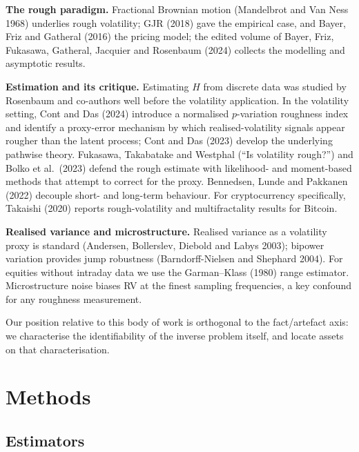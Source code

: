 \documentclass[11pt]{article}
\begin{document}
\noindent\textbf{The rough paradigm.} Fractional Brownian motion (Mandelbrot and
Van Ness 1968) underlies rough volatility; GJR (2018) gave the empirical case, and
Bayer, Friz and Gatheral (2016) the pricing model; the edited volume of Bayer,
Friz, Fukasawa, Gatheral, Jacquier and Rosenbaum (2024) collects the modelling and
asymptotic results.

\medskip
\noindent\textbf{Estimation and its critique.} Estimating $H$ from discrete data
was studied by Rosenbaum and co-authors well before the volatility application. In
the volatility setting, Cont and Das (2024) introduce a normalised $p$-variation
roughness index and identify a proxy-error mechanism by which realised-volatility
signals appear rougher than the latent process; Cont and Das (2023) develop the
underlying pathwise theory. Fukasawa, Takabatake and Westphal (``Is volatility
rough?'') and Bolko et al.\ (2023) defend the rough estimate with likelihood- and
moment-based methods that attempt to correct for the proxy. Bennedsen, Lunde and
Pakkanen (2022) decouple short- and long-term behaviour. For cryptocurrency
specifically, Takaishi (2020) reports rough-volatility and multifractality results
for Bitcoin.

\medskip
\noindent\textbf{Realised variance and microstructure.} Realised variance as a
volatility proxy is standard (Andersen, Bollerslev, Diebold and Labys 2003);
bipower variation provides jump robustness (Barndorff-Nielsen and Shephard 2004).
For equities without intraday data we use the Garman--Klass (1980) range estimator.
Microstructure noise biases RV at the finest sampling frequencies, a key confound
for any roughness measurement.

Our position relative to this body of work is orthogonal to the fact/artefact axis:
we characterise the identifiability of the inverse problem itself, and locate assets
on that characterisation.

\section{Methods}

\subsection{Estimators}
\end{document}
